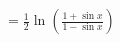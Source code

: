 \documentclass[preview]{standalone}
\begin{document}
\begin{align*}
=\frac{1}{2} \ln \left( \frac{1 + \sin{x}}{1 - \sin{x}} \right)
\end{align*}
\end{document}
